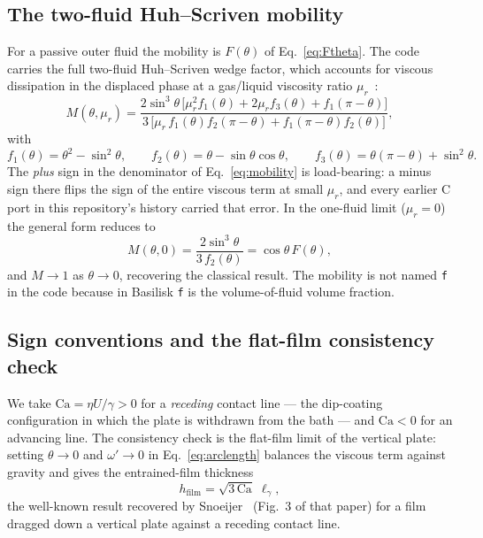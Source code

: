 \documentclass[11pt,a4paper]{article}
\newcommand{\Ca}{\mathrm{Ca}}
\newcommand{\lgamma}{\ell_\gamma}
\newcommand{\mur}{\mu_r}
\begin{document}
\subsection{The two-fluid Huh--Scriven mobility}

For a passive outer fluid the mobility is $F(\theta)$ of
Eq.~\eqref{eq:Ftheta}. The code carries the full two-fluid Huh--Scriven wedge
factor, which accounts for viscous dissipation in the displaced phase at a
gas/liquid viscosity ratio $\mur$~\cite{chan2012}:
\begin{equation}
  M(\theta,\mur) = \frac{2\sin^{3}\theta\,
    \bigl[\mur^{2} f_1(\theta) + 2\mur f_3(\theta) + f_1(\pi-\theta)\bigr]}
   {3\,\bigl[\mur\, f_1(\theta) f_2(\pi-\theta)
     + f_1(\pi-\theta) f_2(\theta)\bigr]},
  \label{eq:mobility}
\end{equation}
with
\begin{equation}
  f_1(\theta) = \theta^{2} - \sin^{2}\theta, \qquad
  f_2(\theta) = \theta - \sin\theta\cos\theta, \qquad
  f_3(\theta) = \theta(\pi-\theta) + \sin^{2}\theta.
  \label{eq:fdefs}
\end{equation}
The \emph{plus} sign in the denominator of Eq.~\eqref{eq:mobility} is
load-bearing: a minus sign there flips the sign of the entire viscous term at
small $\mur$, and every earlier C port in this repository's history carried
that error. In the one-fluid limit ($\mur = 0$) the general form reduces to
\begin{equation}
  M(\theta,0) = \frac{2\sin^{3}\theta}{3\,f_2(\theta)} = \cos\theta\,F(\theta),
\end{equation}
and $M \to 1$ as $\theta \to 0$, recovering the classical result. The mobility
is not named \texttt{f} in the code because in Basilisk \texttt{f} is the
volume-of-fluid volume fraction.

\subsection{Sign conventions and the flat-film consistency check}

We take $\Ca = \eta U/\gamma > 0$ for a \emph{receding} contact line --- the
dip-coating configuration in which the plate is withdrawn from the bath ---
and $\Ca < 0$ for an advancing line. The consistency check is the flat-film
limit of the vertical plate: setting $\theta \to 0$ and $\omega' \to 0$ in
Eq.~\eqref{eq:arclength} balances the viscous term against gravity and gives
the entrained-film thickness
\begin{equation}
  h_{\mathrm{film}} = \sqrt{3\,\Ca}\;\lgamma,
  \label{eq:hfilm}
\end{equation}
the well-known result recovered by Snoeijer~\cite{snoeijer2006} (Fig.~3 of that
paper) for a film dragged down a vertical plate against a receding contact
line.
\end{document}
